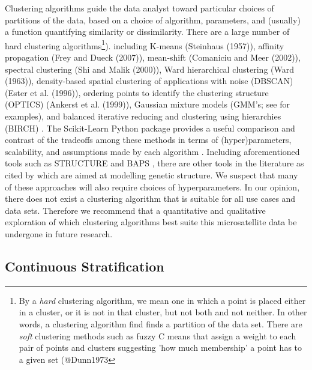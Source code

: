 \documentclass[
  letterpaper,
  DIV=11,
  numbers=noendperiod]{scrreprt}
\begin{document}
Clustering algorithms guide the data analyst toward particular choices
of partitions of the data, based on a choice of algorithm, parameters,
and (usually) a function quantifying similarity or dissimilarity. There
are a large number of hard clustering
algorithms\footnote{By a \textit{hard} clustering algorithm, we mean one in which a point is placed either in a cluster, or it is not in that cluster, but not both and not neither. In other words, a clustering algorithm find finds a partition of the data set. There are \textit{soft} clustering methods such as fuzzy C means that assign a weight to each pair of points and clusters suggesting 'how much membership' a point has to a given set (@Dunn1973}).
including K-means (Steinhaus (1957)), affinity propagation (Frey and
Dueck (2007)), mean-shift (Comaniciu and Meer (2002)), spectral
clustering (Shi and Malik (2000)), Ward hierarchical clustering (Ward
(1963)), density-based spatial clustering of applications with noise
(DBSCAN) (Ester et al. (1996)), ordering points to identify the
clustering structure (OPTICS) (Ankerst et al. (1999)), Gaussian mixture
models (GMM's; see \cite{pedregosa2011} for examples), and balanced
iterative reducing and clustering using hierarchies (BIRCH)
\cite{Zhang1996}. The Scikit-Learn Python package provides a useful
comparison and contrast of the tradeoffs among these methods in terms of
(hyper)parameters, scalability, and assumptions made by each algorithm
\cite{pedregosa2011}. Including aforementioned tools such as STRUCTURE
\cite{Pritchard2000} and BAPS \cite{Corander2003}, there are other tools
in the literature as cited by \cite{Corander2008} which are aimed at
modelling genetic structure. We suspect that many of these approaches
will also require choices of hyperparameters. In our opinion, there does
not exist a clustering algorithm that is suitable for all use cases and
data sets. Therefore we recommend that a quantitative and qualitative
exploration of which clustering algorithms best suite this
microsatellite data be undergone in future research.

\subsection{Continuous Stratification}\label{continuous-stratification}
\end{document}
